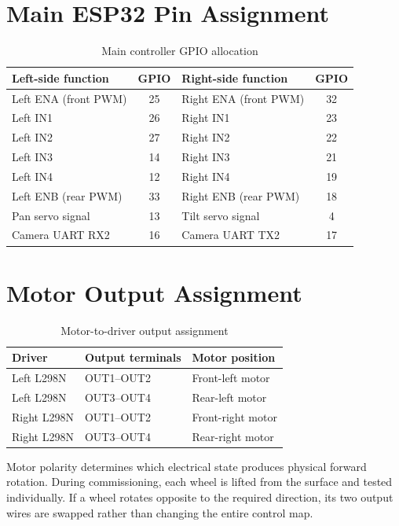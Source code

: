 \documentclass[12pt,a4paper,oneside]{report}
\begin{document}
\section{Main ESP32 Pin Assignment}
\begin{table}[H]
  \centering
  \caption{Main controller GPIO allocation}
  \label{tab:main-gpio}
  \begin{tabularx}{\textwidth}{YcYc}
    \toprule
    \textbf{Left-side function} & \textbf{GPIO} &
    \textbf{Right-side function} & \textbf{GPIO} \\
    \midrule
    Left ENA (front PWM) & 25 & Right ENA (front PWM) & 32 \\
    Left IN1 & 26 & Right IN1 & 23 \\
    Left IN2 & 27 & Right IN2 & 22 \\
    Left IN3 & 14 & Right IN3 & 21 \\
    Left IN4 & 12 & Right IN4 & 19 \\
    Left ENB (rear PWM) & 33 & Right ENB (rear PWM) & 18 \\
    \midrule
    Pan servo signal & 13 & Tilt servo signal & 4 \\
    Camera UART RX2 & 16 & Camera UART TX2 & 17 \\
    \bottomrule
  \end{tabularx}
\end{table}

\section{Motor Output Assignment}
\begin{table}[H]
  \centering
  \caption{Motor-to-driver output assignment}
  \label{tab:motor-output}
  \begin{tabularx}{\textwidth}{YYY}
    \toprule
    \textbf{Driver} & \textbf{Output terminals} & \textbf{Motor position} \\
    \midrule
    Left L298N & OUT1--OUT2 & Front-left motor \\
    Left L298N & OUT3--OUT4 & Rear-left motor \\
    Right L298N & OUT1--OUT2 & Front-right motor \\
    Right L298N & OUT3--OUT4 & Rear-right motor \\
    \bottomrule
  \end{tabularx}
\end{table}

Motor polarity determines which electrical state produces physical forward
rotation. During commissioning, each wheel is lifted from the surface and
tested individually. If a wheel rotates opposite to the required direction,
its two output wires are swapped rather than changing the entire control map.
\end{document}
